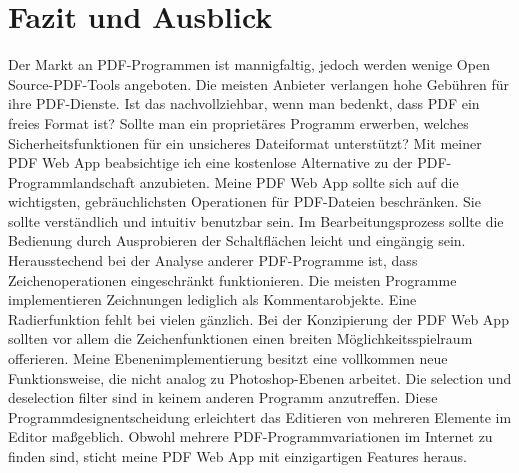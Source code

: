 \chapter{Fazit und Ausblick}
Der Markt an PDF-Programmen ist mannigfaltig, jedoch werden wenige Open Source-PDF-Tools angeboten. Die meisten Anbieter verlangen hohe Gebühren für ihre PDF-Dienste. Ist das nachvollziehbar, wenn man bedenkt, dass PDF ein freies Format ist? Sollte man ein proprietäres Programm erwerben, welches Sicherheitsfunktionen für ein unsicheres Dateiformat unterstützt? Mit meiner PDF Web App beabsichtige ich eine kostenlose Alternative zu der PDF-Programmlandschaft anzubieten. Meine PDF Web App sollte sich auf die wichtigsten, gebräuchlichsten Operationen für PDF-Dateien beschränken. Sie sollte verständlich und intuitiv benutzbar sein. Im Bearbeitungsprozess sollte die Bedienung durch Ausprobieren der Schaltflächen leicht und eingängig sein. Herausstechend bei der Analyse anderer PDF-Programme ist, dass Zeichenoperationen eingeschränkt funktionieren. Die meisten Programme implementieren Zeichnungen lediglich als Kommentarobjekte. Eine Radierfunktion fehlt bei vielen gänzlich. Bei der Konzipierung der PDF Web App sollten vor allem die Zeichenfunktionen einen breiten Möglichkeitsspielraum offerieren. Meine Ebenenimplementierung besitzt eine vollkommen neue Funktionsweise, die nicht analog zu Photoshop-Ebenen arbeitet. Die selection und deselection filter sind in keinem anderen Programm anzutreffen. Diese Programmdesignentscheidung erleichtert das Editieren von mehreren Elemente im Editor maßgeblich. Obwohl mehrere PDF-Programmvariationen im Internet zu finden sind, sticht meine PDF Web App mit einzigartigen Features heraus.
\par
